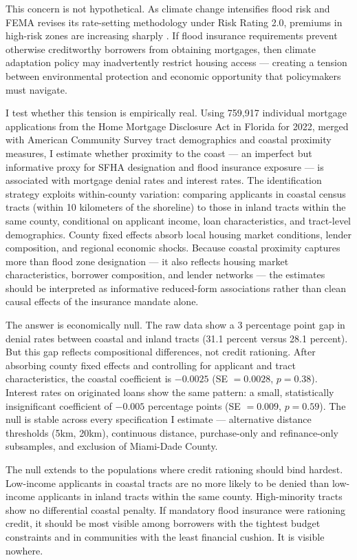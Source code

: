 \documentclass[12pt]{article}
\begin{document}
This concern is not hypothetical. As climate change intensifies flood risk and FEMA revises its rate-setting methodology under Risk Rating 2.0, premiums in high-risk zones are increasing sharply \citep{wing2020estimates, naic2022flood}. If flood insurance requirements prevent otherwise creditworthy borrowers from obtaining mortgages, then climate adaptation policy may inadvertently restrict housing access --- creating a tension between environmental protection and economic opportunity that policymakers must navigate.

I test whether this tension is empirically real. Using 759,917 individual mortgage applications from the Home Mortgage Disclosure Act in Florida for 2022, merged with American Community Survey tract demographics and coastal proximity measures, I estimate whether proximity to the coast --- an imperfect but informative proxy for SFHA designation and flood insurance exposure --- is associated with mortgage denial rates and interest rates. The identification strategy exploits within-county variation: comparing applicants in coastal census tracts (within 10 kilometers of the shoreline) to those in inland tracts within the same county, conditional on applicant income, loan characteristics, and tract-level demographics. County fixed effects absorb local housing market conditions, lender composition, and regional economic shocks. Because coastal proximity captures more than flood zone designation --- it also reflects housing market characteristics, borrower composition, and lender networks --- the estimates should be interpreted as informative reduced-form associations rather than clean causal effects of the insurance mandate alone.

The answer is economically null. The raw data show a 3 percentage point gap in denial rates between coastal and inland tracts (31.1 percent versus 28.1 percent). But this gap reflects compositional differences, not credit rationing. After absorbing county fixed effects and controlling for applicant and tract characteristics, the coastal coefficient is $-0.0025$ (SE $= 0.0028$, $p = 0.38$). Interest rates on originated loans show the same pattern: a small, statistically insignificant coefficient of $-0.005$ percentage points (SE $= 0.009$, $p = 0.59$). The null is stable across every specification I estimate --- alternative distance thresholds (5km, 20km), continuous distance, purchase-only and refinance-only subsamples, and exclusion of Miami-Dade County.

The null extends to the populations where credit rationing should bind hardest. Low-income applicants in coastal tracts are no more likely to be denied than low-income applicants in inland tracts within the same county. High-minority tracts show no differential coastal penalty. If mandatory flood insurance were rationing credit, it should be most visible among borrowers with the tightest budget constraints and in communities with the least financial cushion. It is visible nowhere.
\end{document}

